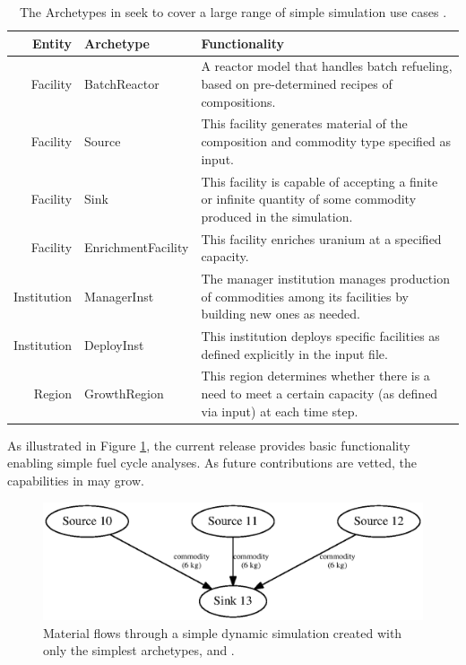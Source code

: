 \begin{table}[h]
\centering
\begin{tabularx}{\textwidth}{|r|l|X|}
\hline
\textbf{Entity} & \textbf{Archetype} & \textbf{Functionality} \\
\hline
Facility & BatchReactor & A reactor model that handles batch refueling, based on pre-determined recipes of compositions. \\
Facility & Source & This facility generates material of the composition and commodity type specified as input.  \\
Facility & Sink & This facility is capable of accepting a finite or infinite quantity of some commodity produced in the simulation. \\
Facility & EnrichmentFacility & This facility enriches uranium at a specified capacity. \\
Institution & ManagerInst & The manager institution manages production of commodities among its facilities by building new ones as needed. \\
Institution & DeployInst &  This institution deploys specific facilities as defined explicitly in the input file. \\
Region & GrowthRegion & This region determines whether there is a need to meet a certain capacity (as defined via input) at each time step. \\
\hline
\end{tabularx}
\caption{The Archetypes in \Cycamore seek to cover a large range of simple simulation use cases \cite{carlsen_cycamore_2014}.}
\label{tab:cycamore}
\end{table}

As illustrated in
Figure \ref{fig:simplesim}, the current \Cycamore release provides basic
functionality enabling simple fuel cycle analyses. As future contributions are
vetted, the capabilities in \Cycamore may grow.

\begin{figure}[htbp!]
\begin{center}
\includegraphics{./images/simplesim}
\end{center}
\caption{Material flows through a simple dynamic simulation created with only the simplest \Cycamore archetypes,  and .}
\label{fig:simplesim}
\end{figure}

